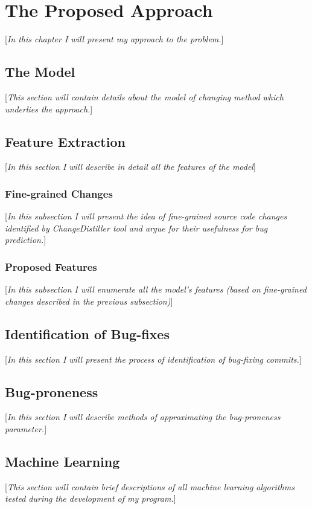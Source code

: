 \documentclass{pracamgr}
\begin{document}
\chapter{The Proposed Approach}
[\textit{In this chapter I will present my approach to the problem.}]

\section{The Model}
[\textit{This section will contain details about the model of changing method which underlies the approach.}]

\section{Feature Extraction}
[\textit{In this section I will describe in detail all the features of the model}]

\subsection{Fine-grained Changes}
[\textit{In this subsection I will present the idea of fine-grained source code changes identified by ChangeDistiller tool and argue for their usefulness for bug prediction.}]

\subsection{Proposed Features}
[\textit{In this subsection I will enumerate all the model's features (based on fine-grained changes described in the previous subsection)}]

\section{Identification of Bug-fixes}
[\textit{In this section I will present the process of identification of bug-fixing commits.}]

\section{Bug-proneness}
[\textit{In this section I will describe methods of approximating the bug-proneness parameter.}]

\section{Machine Learning}
[\textit{This section will contain brief descriptions of all machine learning algorithms tested during the development of my program.}]
\end{document}
